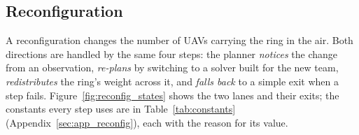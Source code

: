 
\subsection{Reconfiguration}
\label{sec:reconfig}

A reconfiguration changes the number of UAVs carrying the ring in the air. Both directions are handled by the same
four steps: the planner \emph{notices} the change from an observation, \emph{re-plans} by switching to a solver
built for the new team, \emph{redistributes} the ring's weight across it, and \emph{falls back} to a simple exit
when a step fails. Figure~\ref{fig:reconfig_states} shows the two lanes and their exits; the constants every step
uses are in Table~\ref{tab:constants} (Appendix~\ref{sec:app_reconfig}), each with the reason for its value.

